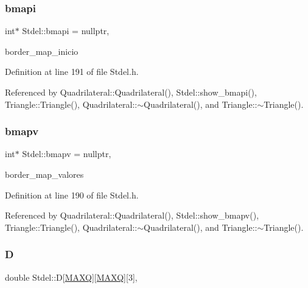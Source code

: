 \subsubsection{\texorpdfstring{bmapi}{bmapi}}
{\footnotesize\ttfamily int$\ast$ Stdel\+::bmapi = nullptr\hspace{0.3cm}{\ttfamily [protected]}, {\ttfamily [inherited]}}



border\+\_\+map\+\_\+inicio 



Definition at line 191 of file Stdel.\+h.



Referenced by Quadrilateral\+::\+Quadrilateral(), Stdel\+::show\+\_\+bmapi(), Triangle\+::\+Triangle(), Quadrilateral\+::$\sim$\+Quadrilateral(), and Triangle\+::$\sim$\+Triangle().

\mbox{\label{classStdel_ac3cd818c98aa400279f28c22c8e0abaa}} 
\subsubsection{\texorpdfstring{bmapv}{bmapv}}
{\footnotesize\ttfamily int$\ast$ Stdel\+::bmapv = nullptr\hspace{0.3cm}{\ttfamily [protected]}, {\ttfamily [inherited]}}



border\+\_\+map\+\_\+valores 



Definition at line 190 of file Stdel.\+h.



Referenced by Quadrilateral\+::\+Quadrilateral(), Stdel\+::show\+\_\+bmapv(), Triangle\+::\+Triangle(), Quadrilateral\+::$\sim$\+Quadrilateral(), and Triangle\+::$\sim$\+Triangle().

\mbox{\label{classStdel_a61f02fa483b00cb98ff5c8d951068211}} 
\subsubsection{\texorpdfstring{D}{D}}
{\footnotesize\ttfamily double Stdel\+::D\mbox{[}\hyperlink{MyOptions_8h_af708e94d886ba3f59582612949cac702}{M\+A\+XQ}\mbox{]}\mbox{[}\hyperlink{MyOptions_8h_af708e94d886ba3f59582612949cac702}{M\+A\+XQ}\mbox{]}\mbox{[}3\mbox{]}\hspace{0.3cm}{\ttfamily [protected]}, {\ttfamily [inherited]}}

